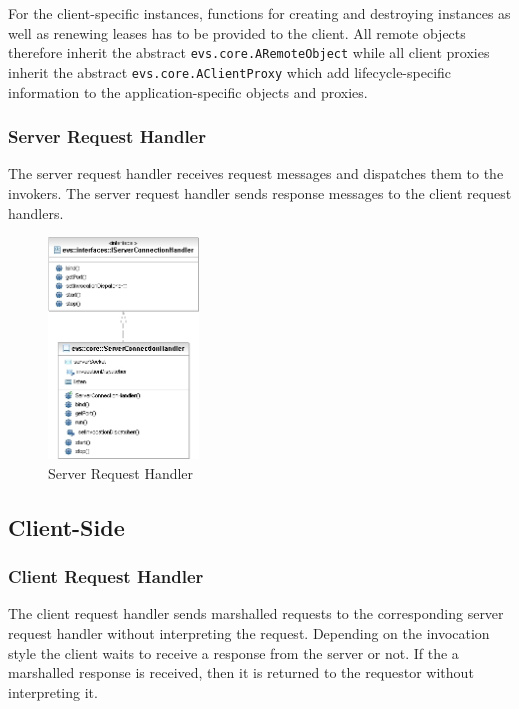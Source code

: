 For the client-specific instances, functions for creating and destroying instances as well as renewing leases has to be provided to the client. All remote objects therefore inherit the abstract \texttt{evs.core.ARemoteObject} while all client proxies inherit the abstract \texttt{evs.core.AClientProxy} which add lifecycle-specific information to the application-specific objects and proxies.


\subsubsection{Server Request Handler}

The server request handler receives request messages and dispatches them to the invokers.
The server request handler sends response messages to the client request handlers.

\begin{figure}[ht!]
	\centering\includegraphics[width=4cm]{uml/ServerRequestHandler.jpg} 
	\caption{Server Request Handler}
	\label{fig:serverrequesthandler}
\end{figure}


\subsection{Client-Side}

\subsubsection{Client Request Handler}

The client request handler sends marshalled requests to the corresponding server request handler without interpreting the request.
Depending on the invocation style the client waits to receive a response from the server or not.
If the a marshalled response is received, then it is returned to the requestor without interpreting it.

